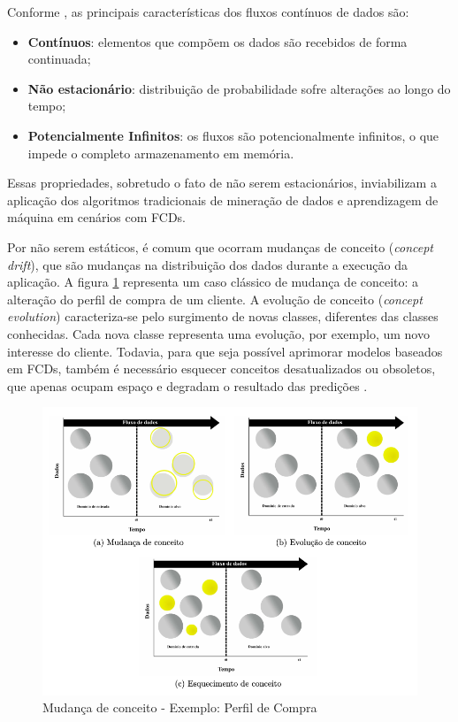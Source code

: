 \documentclass[qual, classic, a4paper]{ufbathesis}
\begin{document}
Conforme \cite{Gama:2014:survey}, as principais características dos fluxos contínuos de dados são:

\begin{itemize}
    \item \textbf{Contínuos}: elementos que compõem os dados são recebidos de forma continuada;

    \item \textbf{Não estacionário}: distribuição de probabilidade sofre alterações ao longo do tempo;

    \item \textbf{Potencialmente Infinitos}: os fluxos são potencionalmente infinitos, o que impede o completo armazenamento em memória.
\end{itemize}

Essas propriedades, sobretudo o fato de não serem estacionários, inviabilizam a aplicação dos algoritmos tradicionais de mineração de dados e aprendizagem de máquina em cenários com FCDs.

Por não serem estáticos, é comum que ocorram mudanças de conceito (\textit{concept drift}), que são mudanças na distribuição dos dados durante a execução da aplicação. A figura \ref{fig1} representa um caso clássico de mudança de conceito: a alteração do perfil de compra de um cliente.
A evolução de conceito (\textit{concept evolution}) caracteriza-se pelo surgimento de novas classes, diferentes das classes conhecidas. Cada nova classe representa uma evolução, por exemplo, um novo interesse do cliente. Todavia, para que seja possível aprimorar modelos baseados em FCDs, também é necessário esquecer conceitos desatualizados ou obsoletos, que apenas ocupam espaço e degradam o resultado das predições \cite{Abdallah}.

\begin{figure}[ht!]
    \begin{center}
      \includegraphics[scale=0.6]{001.png}
    \caption{Mudança de conceito - Exemplo: Perfil de Compra}
    \label{fig1}
    \end{center}
\end{figure}
\end{document}
